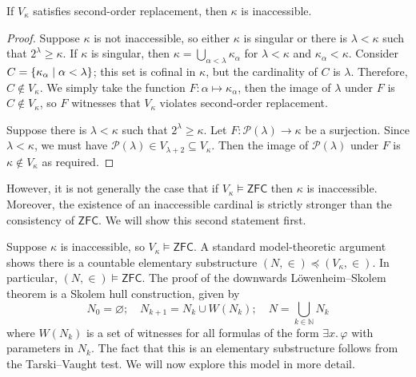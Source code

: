 \begin{theorem}[Shepherdson]
    If \( V_\kappa \) satisfies second-order replacement, then \( \kappa \) is inaccessible.
\end{theorem}
\begin{proof}
    Suppose \( \kappa \) is not inaccessible, so either \( \kappa \) is singular or there is \( \lambda < \kappa \) such that \( 2^\lambda \geq \kappa \).
    If \( \kappa \) is singular, then \( \kappa = \bigcup_{\alpha < \lambda} \kappa_\alpha \) for \( \lambda < \kappa \) and \( \kappa_\alpha < \kappa \).
    Consider \( C = \qty{\kappa_\alpha \mid \alpha < \lambda} \); this set is cofinal in \( \kappa \), but the cardinality of \( C \) is \( \lambda \).
    Therefore, \( C \notin V_\kappa \).
    We simply take the function \( F : \alpha \mapsto \kappa_\alpha \), then the image of \( \lambda \) under \( F \) is \( C \notin V_\kappa \), so \( F \) witnesses that \( V_\kappa \) violates second-order replacement.

    Suppose there is \( \lambda < \kappa \) such that \( 2^\lambda \geq \kappa \).
    Let \( F : \mathcal P(\lambda) \to \kappa \) be a surjection.
    Since \( \lambda < \kappa \), we must have \( \mathcal P(\lambda) \in V_{\lambda + 2} \subseteq V_\kappa \).
    Then the image of \( \mathcal P(\lambda) \) under \( F \) is \( \kappa \notin V_\kappa \) as required.
\end{proof}
However, it is not generally the case that if \( V_\kappa \vDash \mathsf{ZFC} \) then \( \kappa \) is inaccessible.
Moreover, the existence of an inaccessible cardinal is strictly stronger than the consistency of \( \mathsf{ZFC} \).
We will show this second statement first.

Suppose \( \kappa \) is inaccessible, so \( V_\kappa \vDash \mathsf{ZFC} \).
A standard model-theoretic argument shows there is a countable elementary substructure \( (N, \in) \preceq (V_\kappa, \in) \).
In particular, \( (N, \in) \vDash \mathsf{ZFC} \).
The proof of the downwards L\"owenheim--Skolem theorem is a Skolem hull construction, given by
\[ N_0 = \varnothing;\quad N_{k+1} = N_k \cup W(N_k);\quad N = \bigcup_{k \in \mathbb N} N_k \]
where \( W(N_k) \) is a set of witnesses for all formulas of the form \( \exists x.\, \varphi \) with parameters in \( N_k \).
The fact that this is an elementary substructure follows from the Tarski--Vaught test.
We will now explore this model in more detail.

